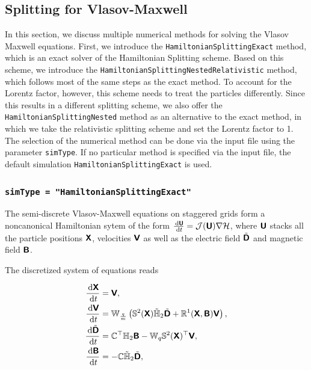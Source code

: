\documentclass[11pt]{article}
\begin{document}

\subsection{Splitting for Vlasov-Maxwell}
\label{sec:splitting_vlasovmaxwell}
In this section, we discuss multiple numerical methods for solving the Vlasov Maxwell equations. First, we introduce the \verb|HamiltonianSplittingExact| method, which is an exact solver of the Hamiltonian Splitting scheme. 
Based on this scheme, we introduce the \verb|HamiltonianSplittingNestedRelativistic| method, which follows most of the same steps as the exact method. To account for the Lorentz factor, however, this scheme needs to treat
the particles differently. Since this results in a different splitting scheme, we also offer the \verb|HamiltonianSplittingNested| method as an alternative to the exact method, in which we take the relativistic splitting 
scheme and set the Lorentz factor to 1. \\
The selection of the numerical method can be done via the input file using the parameter \verb|simType|. If no particular method is specified via the input file, the default simulation \verb|HamiltonianSplittingExact| is used.

\subsubsection{\verb|simType = "HamiltonianSplittingExact"|}
The semi-discrete Vlasov-Maxwell equations on staggered grids form a noncanonical Hamiltonian sytem of the form $\frac{\, {\rm d} {\boldsymbol {\rm \mathsf{U}}}}{\, {\rm d} t}=\mathcal{J}({\boldsymbol {\rm \mathsf{U}}})\nabla\mathcal{H}$, where ${\boldsymbol {\rm \mathsf{U}}}$ stacks all
the particle positions ${\boldsymbol {\rm \mathsf{X}}}$, velocities ${\boldsymbol {\rm \mathsf{V}}}$ as well as the electric field $\tilde{{\boldsymbol {\rm \mathsf{D}}}}$ and magnetic field ${\boldsymbol {\rm \mathsf{B}}}$.

The discretized system of equations reads

\begin{equation}
    \begin{aligned}
        \frac{\, {\rm d} {\boldsymbol {\rm \mathsf{X}}}}{\, {\rm d} t}       & = {\boldsymbol {\rm \mathsf{V}}},                                                                                                   \\
        \frac{\, {\rm d} {\boldsymbol {\rm \mathsf{V}}}}{\, {\rm d} t}       & = \mathbb{W}_{\frac{q}{m}} \left( \mathbb{S}^2({\boldsymbol {\rm \mathsf{X}}})\tilde{\mathbb{H}}_2 \tilde{{\boldsymbol {\rm \mathsf{D}}}} + \mathbb{R}^1({\boldsymbol {\rm \mathsf{X}}}, {\boldsymbol {\rm \mathsf{B}}}) {\boldsymbol {\rm \mathsf{V}}}\right), \\
        \frac{\, {\rm d} \tilde{{\boldsymbol {\rm \mathsf{D}}}}}{\, {\rm d} t} & = \mathbb{C}^\top \mathbb{H}_2 {\boldsymbol {\rm \mathsf{B}}} - \mathbb{W}_q \mathbb{S}^2({\boldsymbol {\rm \mathsf{X}}})^\top {\boldsymbol{\rm \mathsf{V}}},                                          \\
        \frac{\, {\rm d} {\boldsymbol {\rm \mathsf{B}}}}{\, {\rm d} t}       & = -\mathbb{C} \tilde{\mathbb{H}}_2 \tilde{{\boldsymbol {\rm \mathsf{D}}}},
    \end{aligned}
\end{equation}
\end{document}
